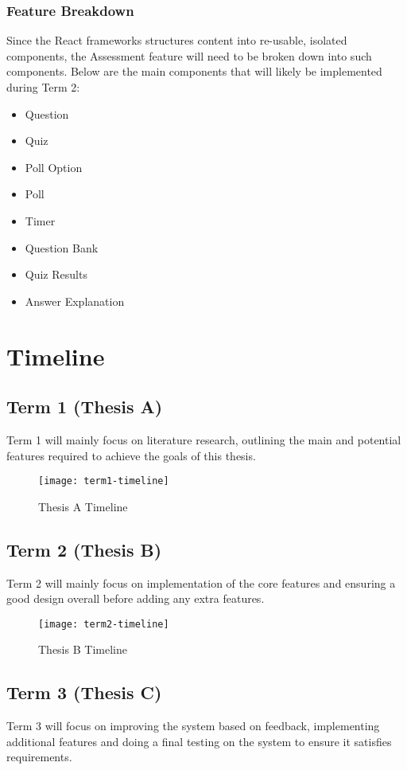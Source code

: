 \subsubsection{Feature Breakdown}
Since the React frameworks structures content into re-usable, isolated components, the Assessment feature will need to be broken down into such components. Below are the main components that will likely be implemented during Term 2:
\begin{itemize}
	\item Question
	\item Quiz
	\item Poll Option
	\item Poll
	\item Timer
	\item Question Bank
	\item Quiz Results
	\item Answer Explanation
\end{itemize}


\section{Timeline}
\subsection{Term 1 (Thesis A)}
Term 1 will mainly focus on literature research, outlining the main and potential features required to achieve the goals of this thesis. 

\begin{figure}[h!]
\centering
\texttt{[image: term1-timeline]}
\caption{Thesis A Timeline}
\end{figure}

\subsection{Term 2 (Thesis B)}
Term 2 will mainly focus on implementation of the core features and ensuring a good design overall before adding any extra features. 

\begin{figure}[h!]
\centering
\texttt{[image: term2-timeline]}
\caption{Thesis B Timeline}
\end{figure}

\subsection{Term 3 (Thesis C)}
Term 3 will focus on improving the system based on feedback, implementing additional features and doing a final testing on the system to ensure it satisfies requirements. 

